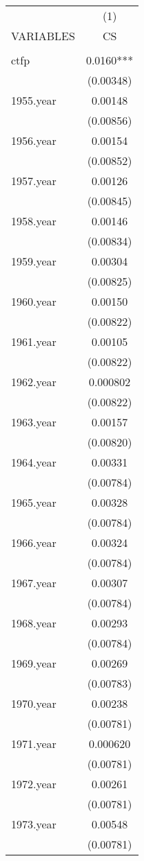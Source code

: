 \documentclass[]{article}
\begin{document}
\begin{tabular}{lc} \hline
 & (1) \\
VARIABLES & CS \\ \hline
 &  \\
ctfp & 0.0160*** \\
 & (0.00348) \\
1955.year & 0.00148 \\
 & (0.00856) \\
1956.year & 0.00154 \\
 & (0.00852) \\
1957.year & 0.00126 \\
 & (0.00845) \\
1958.year & 0.00146 \\
 & (0.00834) \\
1959.year & 0.00304 \\
 & (0.00825) \\
1960.year & 0.00150 \\
 & (0.00822) \\
1961.year & 0.00105 \\
 & (0.00822) \\
1962.year & 0.000802 \\
 & (0.00822) \\
1963.year & 0.00157 \\
 & (0.00820) \\
1964.year & 0.00331 \\
 & (0.00784) \\
1965.year & 0.00328 \\
 & (0.00784) \\
1966.year & 0.00324 \\
 & (0.00784) \\
1967.year & 0.00307 \\
 & (0.00784) \\
1968.year & 0.00293 \\
 & (0.00784) \\
1969.year & 0.00269 \\
 & (0.00783) \\
1970.year & 0.00238 \\
 & (0.00781) \\
1971.year & 0.000620 \\
 & (0.00781) \\
1972.year & 0.00261 \\
 & (0.00781) \\
1973.year & 0.00548 \\
 & (0.00781) \\

\end{tabular}
\end{document}
